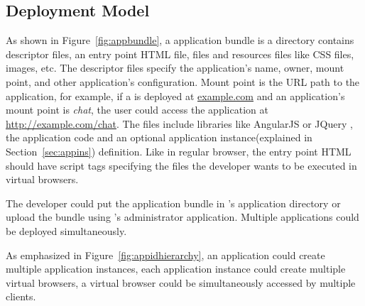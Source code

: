 \subsection{Deployment Model}
\label{sec:deploymodel}
\appbundlefig{}
As shown in Figure~\ref{fig:appbundle}, 
a \cb application bundle is a directory
contains descriptor files, an entry point HTML file,
\js files and resources files like CSS files, images, etc.
The descriptor files specify the application's name, owner, mount point, and
other application's configuration.
Mount point is the URL path to the application, for example,
if a \cb is deployed at \url{example.com} and an application's mount point is
\emph{chat}, the user could access the application at \url{http://example.com/chat}.
The \js files include libraries like AngularJS or JQuery
, the application code and an optional application instance(explained 
in Section~\ref{sec:appins}) definition.
Like in regular browser, the entry point HTML should have script tags
specifying the \js files the developer wants to be executed in virtual browsers.

The developer could put the application bundle in \cb's application 
directory or upload the bundle using \cb's administrator application.
Multiple applications could be deployed simultaneously.

\apphierarchyfig{}

As emphasized in Figure~\ref{fig:appidhierarchy},
an application could create multiple application instances,
each application instance could create multiple virtual browsers,
a virtual browser could be simultaneously accessed by multiple clients.



